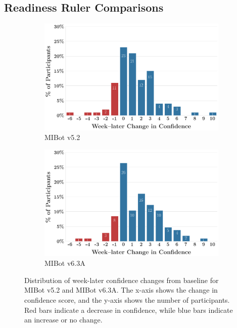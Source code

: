 \subsection*{Readiness Ruler Comparisons}
\begin{figure}[htbp]
	\centering
	\begin{subfigure}[b]{0.48\textwidth}
		\centering
		\includegraphics[width=\textwidth]{fig/MIV5.2_ruler_deltas_delta_with_week_later_keep_high_conf_False_change.png}
		\caption{MIBot v5.2}
		\label{fig:confidence_v5.2}
	\end{subfigure}
	\hfill
	\begin{subfigure}[b]{0.48\textwidth}
		\centering
		\includegraphics[width=\textwidth]{fig/2024-11-14-MIV6.3A-2024-11-22-MIV6.3A_ruler_deltas_delta_with_week_later_keep_high_conf_False_change.png}
		\caption{MIBot v6.3A}
		\label{fig:confidence_v6.3}
	\end{subfigure}


	\caption[Confidence Change Distributions for MIBot v5.2 and v6.3A]{Distribution of week-later confidence changes from baseline for MIBot v5.2 and MIBot v6.3A. The x-axis shows the change in confidence score, and the y-axis shows the number of participants. Red bars indicate a decrease in confidence, while blue bars indicate an increase or no change.}
	\label{fig:confidence_distributions}
\end{figure}










